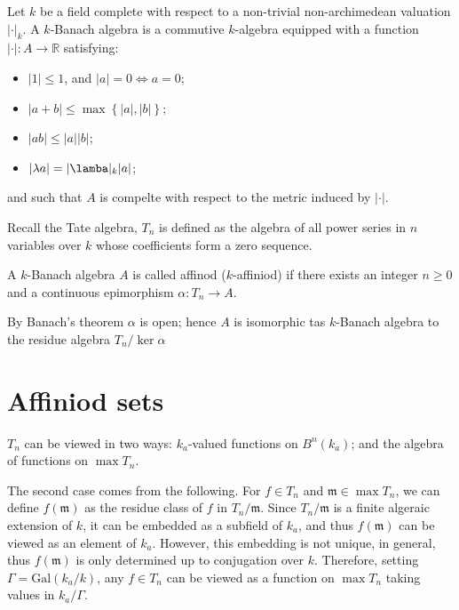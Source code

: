 \begin{definition}
  Let $k$ be a field complete with respect to a non-trivial non-archimedean valuation
  $\lvert \cdot \rvert_k$. A $k$-Banach algebra is a commutive $k$-algebra equipped with a function
  $\lvert \cdot \rvert : A \to \mathbb{R}$ satisfying:
  \begin{itemize}
    \item $\lvert 1 \rvert \leq 1$, and $\lvert a \rvert = 0 \iff a = 0 $;
    \item $\lvert a + b \rvert \leq \max \left\{ \lvert a \rvert, \lvert b \rvert \right\}$;
    \item $\lvert a b \rvert \leq \lvert a \rvert \lvert b \rvert$;
    \item $\lvert \lambda a \rvert = \lvert \lamba \rvert_k \lvert a \rvert$;
  \end{itemize}
  and such that $A$ is compelte with respect to the metric induced by $\lvert \cdot \rvert$.
\end{definition}

Recall the Tate algebra, $T_n$ is defined as the algebra of all power series in $n$ variables over
$k$ whose coefficients form a zero sequence.

\begin{definition}
  A $k$-Banach algebra $A$ is called affinod ($k$-affiniod) if there exists an integer $n \geq 0$
  and a continuous epimorphism $\alpha : T_n \to A$.
\end{definition}

By Banach's theorem %
$\alpha$ is open; hence $A$ is isomorphic tas $k$-Banach algebra to the residue algebra
$T_n / \ker \alpha$

\section{Affiniod sets}

$T_n$ can be viewed in two ways: $k_a$-valued functions on $B^n(k_a)$; and the algebra of functions
on $\max T_n$.

The second case comes from the following. For $f \in T_n$ and $\mathfrak{m} \in \max T_n$, we can
define $f (\mathfrak{m})$ as the residue class of $f$ in $T_n / \mathfrak{m}$. Since
$T_n / \mathfrak{m}$ is a finite algeraic extension of $k$, it can be embedded as a subfield of
$k_a$, and thus $f (\mathfrak{m})$ can be viewed as an element of $k_a$. However, this embedding is
not unique, in general, thus $f (\mathfrak{m})$ is only determined up to conjugation over $k$.
Therefore, setting $\Gamma = \text{Gal}(k_a/k)$, any $f \in T_n$ can be viewed as a function on
$\max T_n$ taking values in $k_a / \Gamma$.

